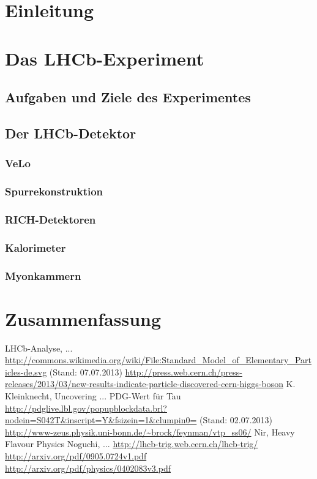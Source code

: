\documentclass[a4paper]{scrbook}
\begin{document}

\tableofcontents

\chapter{Einleitung}

\chapter{Das LHCb-Experiment}
\section{Aufgaben und Ziele des Experimentes}
\section{Der LHCb-Detektor}
\subsection{VeLo}
\subsection{Spurrekonstruktion}
\subsection{RICH-Detektoren}
\subsection{Kalorimeter}
\subsection{Myonkammern}






\chapter{Zusammenfassung}

\begin{thebibliography}{---}
 LHCb-Analyse, ...
 \url{http://commons.wikimedia.org/wiki/File:Standard_Model_of_Elementary_Particles-de.svg} (Stand: 07.07.2013)
 \url{http://press.web.cern.ch/press-releases/2013/03/new-results-indicate-particle-discovered-cern-higgs-boson}
  K. Kleinknecht, Uncovering ...
 PDG-Wert für Tau \\ \url{http://pdglive.lbl.gov/popupblockdata.brl?nodein=S042T&inscript=Y&fsizein=1&clumpin0=} (Stand: 02.07.2013)
 \url{http://www-zeus.physik.uni-bonn.de/~brock/feynman/vtp_ss06/}
 Nir, Heavy Flavour Physics
 Noguchi, ...
 \url{http://lhcb-trig.web.cern.ch/lhcb-trig/}
 \url{http://arxiv.org/pdf/0905.0724v1.pdf}
 \url{http://arxiv.org/pdf/physics/0402083v3.pdf}
\end{thebibliography}


\end{document}

